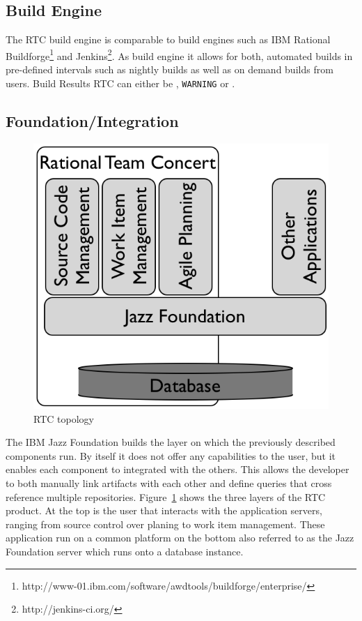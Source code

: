 \subsection{Build Engine}
The RTC build engine is comparable to build engines such as IBM Rational Buildforge\footnote{http://www-01.ibm.com/software/awdtools/buildforge/enterprise/} and Jenkins\footnote{http://jenkins-ci.org/}.
As build engine it allows for both, automated builds in pre-defined intervals such as nightly builds as well as on demand builds from users.
Build Results RTC can either be \error, \texttt{WARNING} or \ok. 

\subsection{Foundation/Integration}
\begin{figure}[t]
\centering
\includegraphics[width=.8\textwidth]{figures/meet-rtc.tex/rtc-topology}
\caption{RTC topology}
\label{fig:rtctopology}
\end{figure}
The IBM Jazz Foundation builds the layer on which the previously described components run.
By itself it does not offer any capabilities to the user, but it enables each component to integrated with the others. 
This allows the developer to both manually link artifacts with each other and define queries that cross reference multiple repositories.
Figure~\ref{fig:rtctopology} shows the three layers of the RTC product.
At the top is the user that interacts with the application servers, ranging from source control over planing to work item management.
These application run on a common platform on the bottom also referred to as the Jazz Foundation server which runs onto a database instance.

